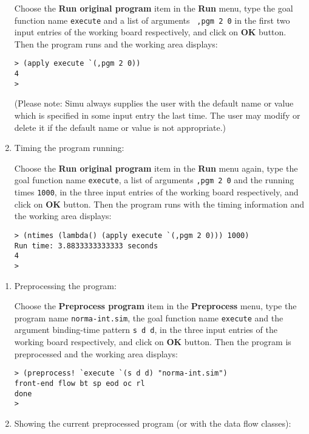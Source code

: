 \begin{sloppypar}
\begin{enumerate}
   Choose the {\bf Run original program} item in the {\bf Run} menu,
type the goal function name {\tt execute} and a list of arguments {\tt
,pgm 2 0} in the first two input entries of the working board
respectively, and click on {\bf OK} button. Then the program runs and
the working area displays:

\begin{verbatim}
> (apply execute `(,pgm 2 0))
4
>
\end{verbatim}

   (Please note: Simu always supplies the user with the default name
or value which is specified in some input entry the last time. The
user may modify or delete it if the default name or value is not
appropriate.)

\item Timing the program running:

   Choose the {\bf Run original program} item in the {\bf Run} menu
again, type the goal function name {\tt execute}, a list of arguments
{\tt ,pgm 2 0} and the running times {\tt 1000}, in the three input
entries of the working board respectively, and click on {\bf OK}
button. Then the program runs with the timing information and the
working area displays:

\begin{verbatim}
> (ntimes (lambda() (apply execute `(,pgm 2 0))) 1000)
Run time: 3.8833333333333 seconds
4
>
\end{verbatim}
\end{enumerate}

\begin{enumerate}
\item Preprocessing the program:

   Choose the {\bf Preprocess program} item in the {\bf Preprocess}
menu, type the program name {\tt norma-int.sim}, the goal function
name {\tt execute} and the argument binding-time pattern {\tt s d d},
in the three input entries of the working board respectively, and
click on {\bf OK} button. Then the program is preprocessed and the
working area displays:

\begin{verbatim}
> (preprocess! `execute `(s d d) "norma-int.sim")
front-end flow bt sp eod oc rl
done
>
\end{verbatim}

\item Showing the current preprocessed program (or with the data flow classes):


\end{enumerate}
\end{sloppypar}
